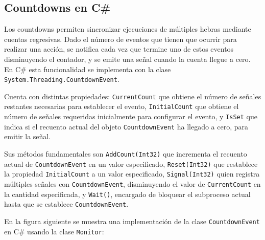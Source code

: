 \documentclass[10pt]{article} %
\newcommand{\csl}[1]{\colorbox{backcolour}{\texttt{#1}}}
\begin{document}
\subsection{Countdowns en C\#}

Los countdowns permiten sincronizar ejecuciones de m\'ultiples hebras mediante cuentas regresivas. Dado el n\'umero de eventos que tienen que ocurrir para realizar una acci\'on, se notifica cada vez que termine uno de estos eventos disminuyendo el contador, y se emite una se\~nal cuando la cuenta llegue a cero. En C\# esta funcionalidad se implementa con la clase \csl{System.Threading.CountdownEvent}. 

Cuenta con distintas propiedades: \csl{CurrentCount} que obtiene el número de señales restantes necesarias para establecer el evento, \csl{InitialCount} que obtiene el número de señales requeridas inicialmente para configurar el evento, y \csl{IsSet} que indica si el recuento actual del objeto \csl{CountdownEvent} ha llegado a cero, para emitir la se\~nal.
	
Sus m\'etodos fundamentales son \csl{AddCount(Int32)} que incrementa el recuento actual de \csl{CountdownEvent} en un valor especificado, \csl{Reset(Int32)} que restablece la propiedad \csl{InitialCount} a un valor especificado, \csl{Signal(Int32)} quien registra múltiples señales con \csl{CountdownEvent}, disminuyendo el valor de \csl{CurrentCount} en la cantidad especificada, y \csl{Wait()}, encargado de bloquear el subproceso actual hasta que se establece \csl{CountdownEvent}.

En la figura siguiente se muestra una implementación de la clase \csl{CountdownEvent} en C\# usando la clase \csl{Monitor}:
\end{document}
